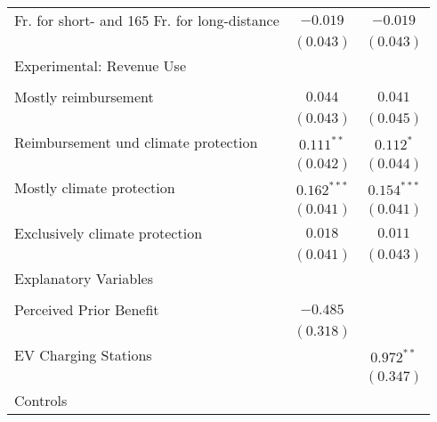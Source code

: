 \begin{center}
\begin{tiny}
\begin{longtable}{l@{} c@{} c@{}}
\quad 55 Fr. for short- and 165 Fr. for long-distance    & $-0.019$         & $-0.019$         \\
                                                         & $(0.043)$        & $(0.043)$        \\
Experimental: Revenue Use                                &                  &                  \\
                                                         &                  &                  \\
\quad Mostly reimbursement                               & $0.044$          & $0.041$          \\
                                                         & $(0.043)$        & $(0.045)$        \\
\quad Reimbursement und climate protection               & $0.111^{**}$     & $0.112^{*}$      \\
                                                         & $(0.042)$        & $(0.044)$        \\
\quad Mostly climate protection                          & $0.162^{***}$    & $0.154^{***}$    \\
                                                         & $(0.041)$        & $(0.041)$        \\
\quad Exclusively climate protection                     & $0.018$          & $0.011$          \\
                                                         & $(0.041)$        & $(0.043)$        \\
Explanatory Variables                                    &                  &                  \\
                                                         &                  &                  \\
\quad Perceived Prior Benefit                            & $-0.485$         &                  \\
                                                         & $(0.318)$        &                  \\
\quad EV Charging Stations                               &                  & $0.972^{**}$     \\
                                                         &                  & $(0.347)$        \\
Controls                                                 &                  &                  \\

\end{longtable}
\end{tiny}
\end{center}
